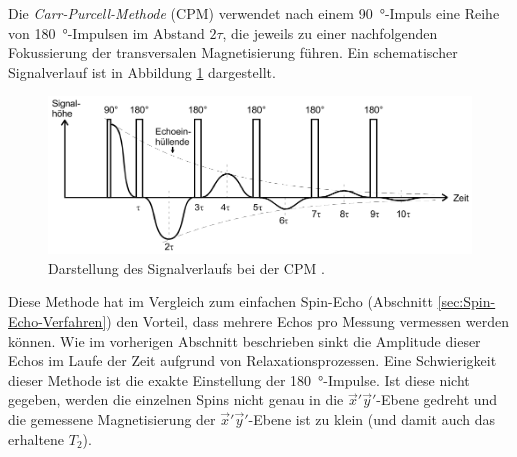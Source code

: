 Die \emph{Carr-Purcell-Methode} (CPM) verwendet nach einem \SI{90}{\degree}-Impuls
eine Reihe von \SI{180}{\degree}-Impulsen im Abstand $2 \tau$, die jeweils
zu einer nachfolgenden Fokussierung der transversalen Magnetisierung führen.
Ein schematischer Signalverlauf ist in Abbildung \ref{fig:Carr-Purcell-Methode}
dargestellt.
\begin{figure}
  \centering
  \includegraphics[width=.9\textwidth]{images/carr-purcell.pdf}
  \caption{Darstellung des Signalverlaufs bei der CPM \cite[11]{anleitung}.}
  \label{fig:Carr-Purcell-Methode}
\end{figure}
Diese Methode hat im Vergleich zum einfachen Spin-Echo
(Abschnitt \ref{sec:Spin-Echo-Verfahren}) den Vorteil, dass mehrere
Echos pro Messung vermessen werden können.
Wie im vorherigen Abschnitt beschrieben sinkt die Amplitude dieser Echos im
Laufe der Zeit aufgrund von Relaxationsprozessen.
Eine Schwierigkeit dieser Methode ist die exakte Einstellung der
\SI{180}{\degree}-Impulse.
Ist diese nicht gegeben, werden die einzelnen Spins nicht genau in die
$\vec{x}' \vec{y}'$-Ebene gedreht und die gemessene Magnetisierung
der $\vec{x}' \vec{y}'$-Ebene ist zu klein (und damit auch das erhaltene $T_2$).

